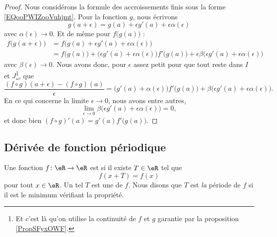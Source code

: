\begin{proof}
	Nous considérons la formule des accroissements finis sous la forme \eqref{EQooPWIZooVuhjmt}. Pour la fonction \( g\), nous écrivons
	\begin{equation}
		g(a+\epsilon)=g(a)+\epsilon g'(a)+\epsilon\alpha(\epsilon)
	\end{equation}
	avec \( \alpha(\epsilon)\to 0\). Et de même pour \( f\big( g(a) \big)\) :
	\begin{subequations}
		\begin{align}
			f\big( g(a+\epsilon) \big)  & =f\big( g(a)+\epsilon g'(a)+\epsilon\alpha(\epsilon) \big)                                                                                                \\
			                            & =f\big( g(a) \big)+\big( \epsilon g'(a)+\epsilon\alpha(\epsilon) \big)f'\big( g(a) \big)+\epsilon\beta\big( \epsilon g'(a)+\epsilon\alpha(\epsilon) \big)
		\end{align}
	\end{subequations}
	avec \( \beta(\epsilon)\to 0\). Nous avons donc, pour \( \epsilon\) assez petit pour que tout reste dans \( I\) et \( J\)\footnote{Et c'est là qu'on utilise la continuité de \( f\) et \( g\) garantie par la proposition \ref{PropSFyxOWF}.}, que
	\begin{equation}
		\frac{ (f\circ g)(a+\epsilon)-(f\circ g)(a) }{ \epsilon }=\big( g'(a)+\alpha(\epsilon) \big)f'\big( g(a) \big)+\beta\big( \epsilon g'(a)+\epsilon\alpha(\epsilon) \big).
	\end{equation}
	En ce qui concerne la limite \( \epsilon\to 0\), nous avons entre autres,
	\begin{equation}
		\lim_{\epsilon\to 0}\beta\big( \epsilon g'(a)+\epsilon\alpha(\epsilon) \big)=0,
	\end{equation}
	et donc bien \( (f\circ g)'(a)=g'( a )f'\big( g(a) \big)\).
\end{proof}

\subsection{Dérivée de fonction périodique}

\begin{definition}      \label{DEFooHUZAooYyBmwe}
	Une fonction \( f\colon \eR\to \eR\) est  si il existe \( T\in \eR\) tel que
	\begin{equation}
		f(x+T)=f(x)
	\end{equation}
	pour tout \( x\in \eR\). Un tel \( T\) est une  de \( f\). Nous disons que \( T\) est \emph{la} période de \( f\) si il est le minimum vérifiant la propriété.
\end{definition}

